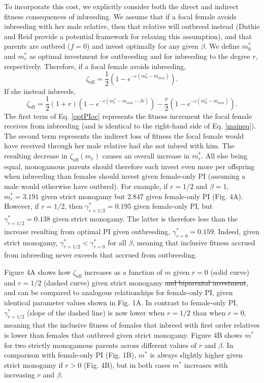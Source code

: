 \documentclass[12pt]{article}
\begin{document}
To incorporate this cost, we explicitly consider both the direct and indirect fitness consequences of inbreeding. We assume that if a focal female avoids inbreeding with her male relative, then that relative will outbreed instead {\color{blue}(Duthie and Reid \cite{Duthie2015a} provide a potential framework for relaxing this assumption)}, and that parents are outbred ($f=0$) and invest optimally for any given $\beta$. We define $m^{*}_{0}$ and $m^{*}_{r}$ as optimal investment for outbreeding and for inbreeding to the degree $r$, respectively. Therefore, if a focal female avoids inbreeding,
\begin{equation} \label{optPI}
\zeta_{\textrm{off}} = \frac{1}{2}\left(1-e^{-c\left(m^{*}_{0}-m_{min}\right)}\right).
\end{equation}
If she instead inbreeds,
\begin{equation} \label{optPIoc}
\zeta_{\textrm{off}} = \frac{1}{2}\left(1+r\right)\left(1-e^{-c\left(m^{*}_{r}-m_{min}-\beta r\right)}\right) - \frac{r}{2}\left(1-e^{-c\left(m^{*}_{0}-m_{min}\right)}\right).
\end{equation} 
The first term of Eq. \ref{optPIoc} represents the fitness increment the focal female receives from inbreeding (and is identical to the right-hand side of Eq. \ref{maineq}). The second term represents the indirect loss of fitness the focal female would have received through her male relative had she not inbred with him. The resulting decrease in $\zeta_{\textrm{off}}(m_{r})$ causes an overall increase in $m^{*}_{r}$. All else being equal, monogamous parents should therefore each invest even more per offspring when inbreeding than females should invest given female-only PI (assuming a male would otherwise have outbred). For example, if $r=1/2$ and $\beta=1$, $m^{*}_{r}= 3.191$ given strict monogamy but $2.847$ given female-only PI (Fig. 4A).  However, if $r=1/2$, then $\gamma^{*}_{r=1/2}=0.195$ given female-only PI, but $\gamma^{*}_{r=1/2}=0.138$ given strict monogamy. The latter is therefore less than the increase resulting from optimal PI given outbreeding, $\gamma^{*}_{r=0}=0.159$. Indeed, given strict monogamy, $\gamma^{*}_{r=1/2} < \gamma^{*}_{r=0}$ for all $\beta$, meaning that inclusive fitness accrued from inbreeding never exceeds that accrued from outbreeding. 

Figure 4A shows how $\zeta_{\textrm{off}}$ increases as a function of $m$ given $r=0$ (solid curve) and $r=1/2$ (dashed curve) given strict monogamy {\color{red}\st{and biparental investment}}, and can be compared to analogous relationships for female-only PI, given identical parameter values shown in Fig. 1A. In contrast to female-only PI, $\gamma^{*}_{r=1/2}$ (slope of the dashed line) is now lower when $r=1/2$ than when $r=0$, meaning that the inclusive fitness of females that inbreed with first order relatives is lower than females that outbreed given strict monogamy. Figure 4B shows $m^{*}$ for two strictly monogamous parents across different values of $r$ and $\beta$. In comparison with female-only PI (Fig. 1B), $m^{*}$ is always slightly higher given strict monogamy if $r>0$ (Fig. 4B), but in both cases $m^{*}$ increases with increasing $r$ and $\beta$. 
\end{document}
